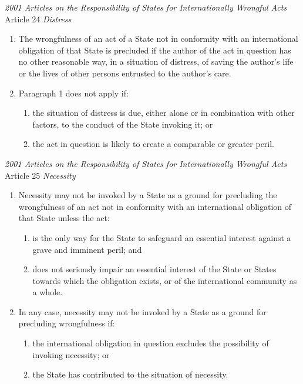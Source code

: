 \begin{conventiondetails}{\textit{2001 Articles on the Responsibility of States for Internationally Wrongful Acts} Article 24}
    \flushleft
    \textit{Distress}

    \begin{enumerate}
        \item The wrongfulness of an act of a State not in conformity with an international obligation of that State is precluded if the author of the act in question has no other reasonable way, in a situation of distress, of saving the author's life or the lives of other persons entrusted to the author's care.
        \item Paragraph 1 does not apply if:
        \begin{enumerate}[label=(\alph*)]
            \item the situation of distress is due, either alone or in combination with other factors, to the conduct of the State invoking it; or
            \item the act in question is likely to create a comparable or greater peril.
        \end{enumerate}
    \end{enumerate}
\end{conventiondetails}

\begin{conventiondetails}{\textit{2001 Articles on the Responsibility of States for Internationally Wrongful Acts} Article 25}
    \flushleft
    \textit{Necessity}

    \begin{enumerate}
        \item Necessity may not be invoked by a State as a ground for precluding the wrongfulness of an act not in conformity with an international obligation of that State unless the act:
        \begin{enumerate}[label=(\alph*)]
            \item is the only way for the State to safeguard an essential interest against a grave and imminent peril; and
            \item does not seriously impair an essential interest of the State or States towards which the obligation exists, or of the international community as a whole.
        \end{enumerate}
        \item In any case, necessity may not be invoked by a State as a ground for precluding wrongfulness if:
        \begin{enumerate}[label=(\alph*)]
            \item the international obligation in question excludes the possibility of invoking necessity; or
            \item the State has contributed to the situation of necessity.
        \end{enumerate}
    \end{enumerate}
\end{conventiondetails}

